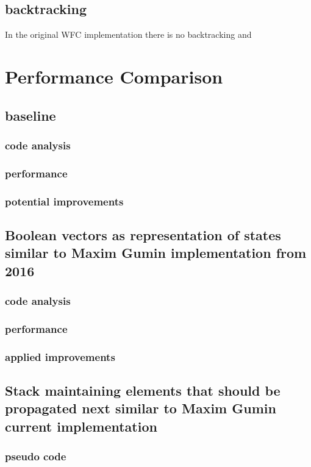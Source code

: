 \documentclass[shortabstract, english, inz]{iithesis}
\begin{document}
\section{backtracking}
\label{backtracking}
In the original WFC implementation there is no backtracking and
\cite{Smith}



\chapter{Performance Comparison}
\label{chapter4}
    \section{baseline}
        \subsection{code analysis}
        \subsection{performance}
        \subsection{potential improvements}
    \section{Boolean vectors as representation of states \fmlinebreak similar to Maxim Gumin implementation from 2016}
        \subsection{code analysis}
        \subsection{performance}
        \subsection{applied improvements}
    \section{Stack maintaining elements that should be propagated next \fmlinebreak similar to Maxim Gumin current implementation}
    \label{stack}
        \subsection{pseudo code}
\end{document}
